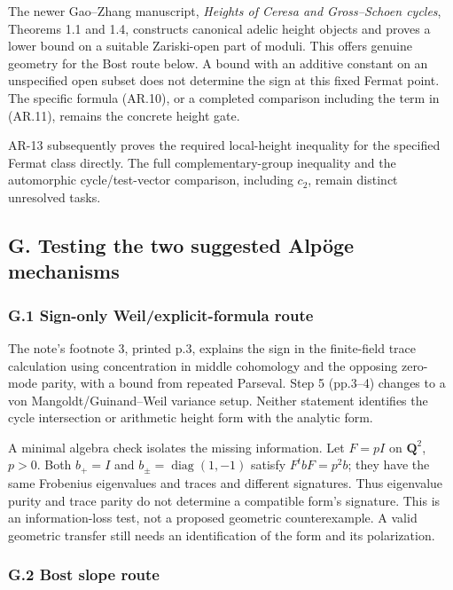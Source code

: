 The newer Gao--Zhang manuscript, \emph{Heights of Ceresa and
Gross--Schoen cycles}, Theorems 1.1 and 1.4, constructs canonical adelic
height objects and proves a lower bound on a suitable Zariski-open part
of moduli. This offers genuine geometry for the Bost route below. A
bound with an additive constant on an unspecified open subset does not
determine the sign at this fixed Fermat point. The specific formula
(AR.10), or a completed comparison including the term in (AR.11),
remains the concrete height gate.

AR-13 subsequently proves the required local-height inequality for the
specified Fermat class directly. The full complementary-group inequality
and the automorphic cycle/test-vector comparison, including \(c_2\),
remain distinct unresolved tasks.

\subsection{G. Testing the two suggested Alpöge
mechanisms}\label{g.-testing-the-two-suggested-alpuxf6ge-mechanisms}

\subsubsection{G.1 Sign-only Weil/explicit-formula
route}\label{g.1-sign-only-weilexplicit-formula-route}

The note's footnote 3, printed p.3, explains the sign in the
finite-field trace calculation using concentration in middle cohomology
and the opposing zero-mode parity, with a bound from repeated Parseval.
Step 5 (pp.3--4) changes to a von Mangoldt/Guinand--Weil variance setup.
Neither statement identifies the cycle intersection or arithmetic height
form with the analytic form.

A minimal algebra check isolates the missing information. Let \(F=pI\)
on \(\mathbf Q^2\), \(p>0\). Both \(b_+=I\) and
\(b_\pm=\operatorname{diag}(1,-1)\) satisfy \(F^tbF=p^2b\); they have
the same Frobenius eigenvalues and traces and different signatures. Thus
eigenvalue purity and trace parity do not determine a compatible form's
signature. This is an information-loss test, not a proposed geometric
counterexample. A valid geometric transfer still needs an identification
of the form and its polarization.

\subsubsection{G.2 Bost slope route}\label{g.2-bost-slope-route}

